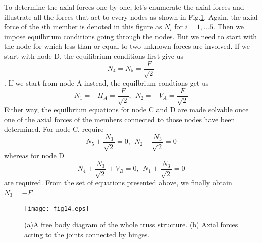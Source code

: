 \documentclass[10pt,a4j]{article}
\begin{document}
\begin{enumerate}
{	To determine the axial forces one by one, let's enumerate the 
	axial forces and illustrate all the forces that act to 
	every nodes as shown in Fig.\ref{fig:fig14}. 
	Again, the axial force of the $i$th member is denoted in 
	this figure as $N_i$ for $i=1,\dots 5$.
	Then we impose equilbrium conditions going through the nodes.
	But we need to start with the node for which less than or equal to 
	two unknown forces are involved. 
	If we start with node D, the equilibrium conditions first give us
	\[ 
		N_4=N_5=\frac{F}{\sqrt{2}}
	\].
	If we start from node A instead, the equilbrium condtions get us 
	\[
		N_1=-H_A=\frac{F}{\sqrt{2}}, \ \ 
		N_2=-V_A=\frac{F}{\sqrt{2}}
	\]
	Either way, the equilbrium equations for node C and D are made 
	solvable once one of the axial forces of the members connected to those 
	nodes have been determined. 
	For node C, require 
	\[
		N_5+\frac{N_3}{\sqrt{2}}=0, \ \ 
		N_2+\frac{N_3}{\sqrt{2}}=0
	\]
	whereas for node D
	\[
		N_4+\frac{N_3}{\sqrt{2}}+V_B=0, \ \ 
		N_1+\frac{N_3}{\sqrt{2}}=0
	\]
	are required. From the set of equations presented above, we 
	finally obtain $N_3=-F$.
}
\begin{figure}[h]
	\begin{center}
	\texttt{[image: fig14.eps]} 
	\end{center}
	\caption{(a)A free body diagram of the whole truss structure.
	(b) Axial forces acting to the joints connected by hinges.} 
	\label{fig:fig14}
\end{figure}
\end{enumerate}
\end{document}
